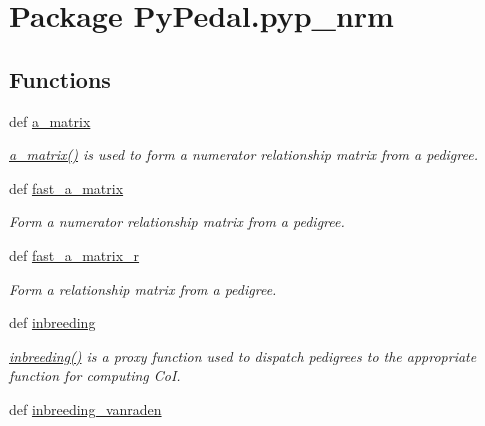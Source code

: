 \hypertarget{namespacePyPedal_1_1pyp__nrm}{
\section{Package Py\-Pedal.pyp\_\-nrm}
\label{namespacePyPedal_1_1pyp__nrm}
}


\subsection*{Functions}
\begin{CompactItemize}
\item 
def \hyperlink{namespacePyPedal_1_1pyp__nrm_160c730a5f8ed4809c427645d3331262}{a\_\-matrix}
\begin{CompactList}\small\item\em \hyperlink{namespacePyPedal_1_1pyp__nrm_160c730a5f8ed4809c427645d3331262}{a\_\-matrix()} is used to form a numerator relationship matrix from a pedigree. \item\end{CompactList}\item 
def \hyperlink{namespacePyPedal_1_1pyp__nrm_d86974b6cb70f5165d7f9b41b68b613e}{fast\_\-a\_\-matrix}
\begin{CompactList}\small\item\em Form a numerator relationship matrix from a pedigree. \item\end{CompactList}\item 
def \hyperlink{namespacePyPedal_1_1pyp__nrm_314c945257fa3c101f6c47c1d4fb4079}{fast\_\-a\_\-matrix\_\-r}
\begin{CompactList}\small\item\em Form a relationship matrix from a pedigree. \item\end{CompactList}\item 
def \hyperlink{namespacePyPedal_1_1pyp__nrm_925b0d16b9dcbd72291dbc2c4209e428}{inbreeding}
\begin{CompactList}\small\item\em \hyperlink{namespacePyPedal_1_1pyp__nrm_925b0d16b9dcbd72291dbc2c4209e428}{inbreeding()} is a proxy function used to dispatch pedigrees to the appropriate function for computing Co\-I. \item\end{CompactList}\item 
def \hyperlink{namespacePyPedal_1_1pyp__nrm_577fd15845cca08988029a7ccf7f68e4}{inbreeding\_\-vanraden}

\end{CompactItemize}
